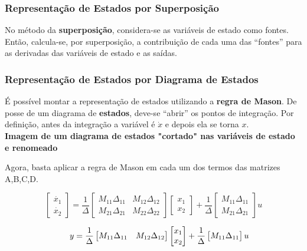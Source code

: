 \documentclass{article}
\numberwithin{equation}{section}
\begin{document}
\subsubsection{Representação de Estados por Superposição}
\label{subsubsec:est_superposição}
No método da \textbf{superposição}, considera-se as variáveis de estado como fontes. Então, calcula-se, por superposição, a contribuição de cada uma das ``fontes'' para as derivadas das variáveis de estado e as saídas.

\subsubsection{Representação de Estados por Diagrama de Estados}
\label{subsubsec:est_mason}
É possível montar a representação de estados utilizando a \textbf{regra de Mason}. De posse de um diagrama de \textbf{estados}, deve-se ``abrir'' os pontos de integração. Por definição, antes da integração a variável é $\dot x$ e depois ela se torna $x$. \\
\textbf{Imagem de um diagrama de estados "cortado" nas variáveis de estado e renomeado}

Agora, basta aplicar a regra de Mason em cada um dos termos das matrizes A,B,C,D.

\begin{equation*}
    \begin{bmatrix}
        \dot{x_{1}}  \\
        \dot{x_{2}}
    \end{bmatrix}
    = \frac{1}{\Delta} %
    \begin{bmatrix}
        M_{11}\Delta_{11} & M_{12}\Delta_{12}\\
        M_{21}\Delta_{21} & M_{22}\Delta_{22}
    \end{bmatrix}
    \begin{bmatrix}
        x_{1} \\
        x_{2}
    \end{bmatrix}
    + \frac{1}{\Delta}%
    \begin{bmatrix}
        M_{11}\Delta_{11}\\
        M_{21}\Delta_{21}
    \end{bmatrix}
    u
\end{equation*}

\begin{equation*}
    \hspace{0.5cm} y = \frac{1}{\Delta}
    \begin{bmatrix}
        M_{11}\Delta_{11} & M_{12}\Delta_{12}\\
    \end{bmatrix}
    \begin{bmatrix}
        x_{1} \\
        x_{2}
    \end{bmatrix}
    + \frac{1}{\Delta}
    \begin{bmatrix}
        M_{11}\Delta_{11}
    \end{bmatrix}
    u
\end{equation*}
\end{document}
